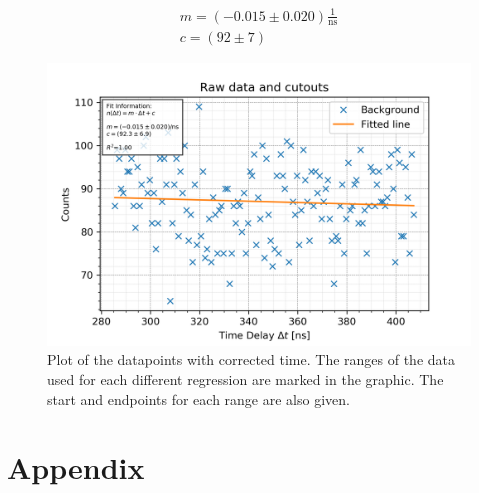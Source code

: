 \documentclass[30pt,a4paper]{article}
\begin{document}
	\begin{eqnarray}
	m = (-0.015 \pm 0.020)\frac{1}{\textrm{ns}} \\
	c = (92 \pm 7)
	\end{eqnarray}
	
	
	
	\begin{figure}[h]
		\includegraphics{Bilder/lin_bkgnd}
		\centering
		\caption{\small Plot of the datapoints with corrected time. The ranges of the data used for each different regression are marked in the graphic. The start and endpoints for each range are also given.}
		\label{bckgnd_fit}
	\end{figure}

 	\section{Appendix}
 	
 	
\end{document}
